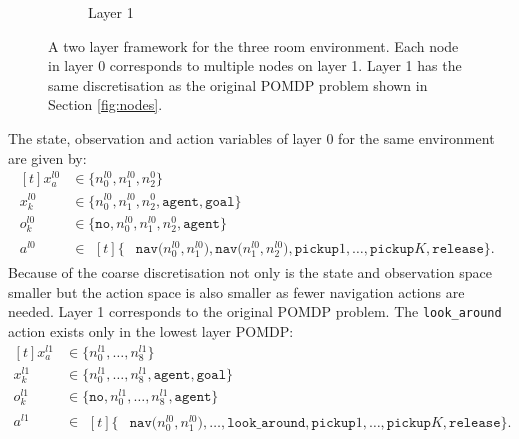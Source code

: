 \begin{figure}
\begin{subfigure}[b]{0.48\textwidth}
        \caption{Layer 1}
        \label{subfig:l1}
    \end{subfigure}
    \caption{A two layer framework for the three room environment. Each node in layer 0 corresponds to multiple nodes on layer 1. Layer 1 has the same discretisation as the original POMDP problem shown in Section \ref{fig:nodes}.}
    \label{fig:two_layers}
\end{figure}
The state, observation and action variables of layer 0 for the same environment are given by:
%
\begin{equation}\label{eq:l0}
    \begin{aligned}[t] 
        x_a^{l0} &\in \big\{n_0^{l0}, n_1^{l0}, n_2^{0}  \big\} \\
        x_k^{l0} &\in  \big\{n_0^{l0}, n_1^{l0}, n_2^{0}, \texttt{agent},\texttt{goal}  \big\}\\
        o_k^{l0} &\in \big\{\texttt{no}, n_0^{l0}, n_1^{l0}, n_2^{0}, \texttt{agent} \big\}\\
        a^{l0} &\in \begin{aligned}[t]\big\{&\texttt{nav($n_0^{l0}, n_1^{l0}$)}, \texttt{nav($n_1^{l0}, n_2^{l0}$)},\texttt{pickup}1, \ldots, \texttt{pickup}K, \texttt{release}\big\}.
        \end{aligned}
    \end{aligned}
\end{equation}
%
Because of the coarse discretisation not only is the state and observation space smaller but the action space is also smaller as fewer navigation actions are needed. Layer 1 corresponds to the original POMDP problem. The \texttt{look\_around} action exists only in the lowest layer POMDP:
%
\begin{equation}\label{eq:l1}
    \begin{aligned}[t] 
        x_a^{l1} &\in \big\{n_0^{l1}, \ldots, n_8^{l1} \big\} \\
        x_k^{l1} &\in  \big\{n_0^{l1},\ldots, n_8^{l1}, \texttt{agent},\texttt{goal}  \big\}\\
        o_k^{l1} &\in \big\{\texttt{no}, n_0^{l1},\ldots, n_8^{l1}, \texttt{agent} \big\}\\
        a^{l1} &\in \begin{aligned}[t]\big\{&\texttt{nav($n_0^{l0}, n_1^{l0}$)}, \ldots,\texttt{look\_around}, \texttt{pickup}1, \ldots, \texttt{pickup}K, \texttt{release}\big\}.
        \end{aligned}
    \end{aligned}
\end{equation}
